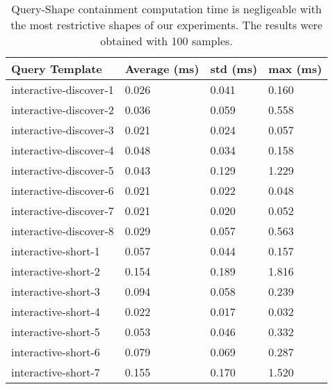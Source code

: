 \begin{table}
	\begin{center}
		\begin{tabular}{|l|l|l|l|}
			\hline
			Query Template & Average (ms) & std (ms) & max (ms) \\
			\hline
			interactive-discover-1 & 0.026 & 0.041 & 0.160 \\
			\hline
			interactive-discover-2 & 0.036 & 0.059 & 0.558 \\
			\hline
			interactive-discover-3 & 0.021 & 0.024 & 0.057 \\
			\hline
			interactive-discover-4 & 0.048 & 0.034 & 0.158 \\
			\hline
			interactive-discover-5 & 0.043 & 0.129 & 1.229 \\
			\hline
			interactive-discover-6 & 0.021 & 0.022 & 0.048 \\
			\hline
			interactive-discover-7 & 0.021 & 0.020 & 0.052 \\
			\hline
			interactive-discover-8 & 0.029 & 0.057 & 0.563 \\
			\hline
			interactive-short-1 & 0.057 & 0.044 & 0.157 \\
			\hline
			interactive-short-2 & 0.154 & 0.189 & 1.816 \\
			\hline
			interactive-short-3 & 0.094 & 0.058 & 0.239 \\
			\hline
			interactive-short-4 & 0.022 & 0.017 & 0.032 \\
			\hline
			interactive-short-5 & 0.053 & 0.046 & 0.332 \\
			\hline
			interactive-short-6 & 0.079 & 0.069 & 0.287 \\
			\hline
			interactive-short-7 & 0.155 & 0.170 & 1.520 \\
			\hline
		\end{tabular}
	\end{center}
	\caption{Query-Shape containment computation time is negligeable with the most restrictive shapes of our experiments. The results were obtained with 100 samples.}
	\label{tab:queryShapeContainmentEval}
\end{table}